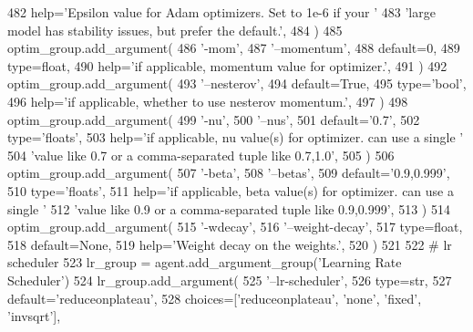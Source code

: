 \begin{DoxyCode}
482             help=\textcolor{stringliteral}{'Epsilon value for Adam optimizers. Set to 1e-6 if your '}
483             \textcolor{stringliteral}{'large model has stability issues, but prefer the default.'},
484         )
485         optim\_group.add\_argument(
486             \textcolor{stringliteral}{'-mom'},
487             \textcolor{stringliteral}{'--momentum'},
488             default=0,
489             type=float,
490             help=\textcolor{stringliteral}{'if applicable, momentum value for optimizer.'},
491         )
492         optim\_group.add\_argument(
493             \textcolor{stringliteral}{'--nesterov'},
494             default=\textcolor{keyword}{True},
495             type=\textcolor{stringliteral}{'bool'},
496             help=\textcolor{stringliteral}{'if applicable, whether to use nesterov momentum.'},
497         )
498         optim\_group.add\_argument(
499             \textcolor{stringliteral}{'-nu'},
500             \textcolor{stringliteral}{'--nus'},
501             default=\textcolor{stringliteral}{'0.7'},
502             type=\textcolor{stringliteral}{'floats'},
503             help=\textcolor{stringliteral}{'if applicable, nu value(s) for optimizer. can use a single '}
504             \textcolor{stringliteral}{'value like 0.7 or a comma-separated tuple like 0.7,1.0'},
505         )
506         optim\_group.add\_argument(
507             \textcolor{stringliteral}{'-beta'},
508             \textcolor{stringliteral}{'--betas'},
509             default=\textcolor{stringliteral}{'0.9,0.999'},
510             type=\textcolor{stringliteral}{'floats'},
511             help=\textcolor{stringliteral}{'if applicable, beta value(s) for optimizer. can use a single '}
512             \textcolor{stringliteral}{'value like 0.9 or a comma-separated tuple like 0.9,0.999'},
513         )
514         optim\_group.add\_argument(
515             \textcolor{stringliteral}{'-wdecay'},
516             \textcolor{stringliteral}{'--weight-decay'},
517             type=float,
518             default=\textcolor{keywordtype}{None},
519             help=\textcolor{stringliteral}{'Weight decay on the weights.'},
520         )
521 
522         \textcolor{comment}{# lr scheduler}
523         lr\_group = agent.add\_argument\_group(\textcolor{stringliteral}{'Learning Rate Scheduler'})
524         lr\_group.add\_argument(
525             \textcolor{stringliteral}{'--lr-scheduler'},
526             type=str,
527             default=\textcolor{stringliteral}{'reduceonplateau'},
528             choices=[\textcolor{stringliteral}{'reduceonplateau'}, \textcolor{stringliteral}{'none'}, \textcolor{stringliteral}{'fixed'}, \textcolor{stringliteral}{'invsqrt'}],

\end{DoxyCode}
